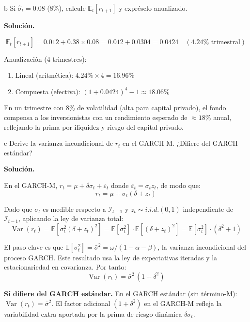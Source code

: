 \documentclass[11pt,a4paper]{article}
\newcommand{\E}{\mathbb{E}}
\newcommand{\Var}{\operatorname{Var}}
\newcommand{\sigmabar}{\bar{\sigma}^2}
\newcommand{\eps}{\varepsilon}
\begin{document}
\begin{cajaInciso}{b}
Si $\hat{\sigma}_t=0.08$ (8\%), calcule $\E_t[r_{t+1}]$ y expréselo anualizado.
\end{cajaInciso}

\textbf{Solución.}

\[
\E_t[r_{t+1}] = 0.012 + 0.38\times 0.08 = 0.012 + 0.0304 = 0.0424 \quad (4.24\% \text{ trimestral})
\]

Anualización (4 trimestres):
\begin{enumerate}[leftmargin=*]
  \item Lineal (aritmética): $4.24\% \times 4 = 16.96\%$
  \item Compuesta (efectiva): $(1+0.0424)^4 - 1 \approx 18.06\%$
\end{enumerate}

En un trimestre con $8\%$ de volatilidad (alta para capital privado), el fondo compensa a los inversionistas con un rendimiento esperado de $\approx 18\%$ anual, reflejando la prima por iliquidez y riesgo del capital privado.

\begin{cajaInciso}{c}
Derive la varianza incondicional de $r_t$ en el GARCH-M. ¿Difiere del GARCH estándar?
\end{cajaInciso}

\textbf{Solución.}

En el GARCH-M, $r_t = \mu + \delta\sigma_t + \eps_t$ donde $\eps_t = \sigma_t z_t$, de modo que:
\[
r_t = \mu + \sigma_t(\delta + z_t)
\]

Dado que $\sigma_t$ es medible respecto a $\mathcal{I}_{t-1}$ y $z_t \sim i.i.d.(0,1)$ independiente de $\mathcal{I}_{t-1}$, aplicando la ley de varianza total:
\[
\Var(r_t) = \E\!\left[\sigma_t^2(\delta + z_t)^2\right]
= \E\!\left[\sigma_t^2\right]\cdot\E\!\left[(\delta + z_t)^2\right]
= \E[\sigma_t^2]\cdot\left(\delta^2 + 1\right)
\]

El paso clave es que $\E[\sigma_t^2] = \sigmabar = \omega/(1-\alpha-\beta)$, la varianza incondicional del proceso GARCH. Este resultado usa la ley de expectativas iteradas y la estacionariedad en covarianza. Por tanto:
\[
\Var(r_t) = \sigmabar\,(1 + \delta^2)
\]

\textbf{Sí difiere del GARCH estándar.} En el GARCH estándar (sin término-M): $\Var(r_t) = \sigmabar$. El factor adicional $(1+\delta^2)$ en el GARCH-M refleja la variabilidad extra aportada por la prima de riesgo dinámica $\delta\sigma_t$.
\end{document}
